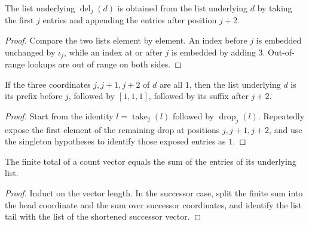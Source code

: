 \begin{lemma}

  \label{lem:ofFn_deleteThree_eq_take_drop}
  The list underlying \(\operatorname{del}_j(d)\) is obtained from the
  list underlying \(d\) by taking the first \(j\) entries and appending
  the entries after position \(j+2\).
\end{lemma}
\begin{proof}

\leanok
  Compare the two lists element by element.  An index before \(j\) is
  embedded unchanged by \(\iota_j\), while an index at or after \(j\) is
  embedded by adding \(3\).  Out-of-range lookups are out of range on
  both sides.
\end{proof}

\begin{lemma}

  \label{lem:ofFn_eq_take_ones_drop}
  If the three coordinates \(j,j+1,j+2\) of \(d\) are all \(1\), then
  the list underlying \(d\) is its prefix before \(j\), followed by
  \([1,1,1]\), followed by its suffix after \(j+2\).
\end{lemma}
\begin{proof}

\leanok
  Start from the identity \(l=\operatorname{take}_j(l)\) followed by
  \(\operatorname{drop}_j(l)\).  Repeatedly expose the first element of
  the remaining drop at positions \(j,j+1,j+2\), and use the singleton
  hypotheses to identify those exposed entries as \(1\).
\end{proof}

\begin{lemma}

  \label{lem:total_eq_list_sum}
  The finite total of a count vector equals the sum of the entries of its
  underlying list.
\end{lemma}
\begin{proof}

\leanok
  Induct on the vector length.  In the successor case, split the finite
  sum into the head coordinate and the sum over successor coordinates,
  and identify the list tail with the list of the shortened successor
  vector.
\end{proof}

